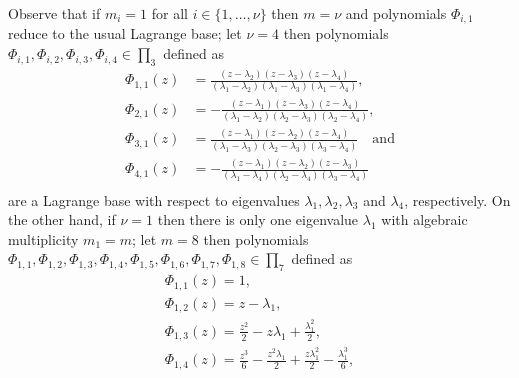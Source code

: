 \begin{remark}
Observe that if $m_{i}=1$ for all $i\in\lbrace 1, \ldots, \nu\rbrace$ then $m=\nu$
and polynomials $\Phi_{i,1}$ reduce to the usual Lagrange base;
let $\nu=4$ then polynomials
$\Phi_{i,1},\Phi_{i,2},\Phi_{i,3},\Phi_{i,4} \in\prod_{3}$ defined as 
\begin{displaymath}
\begin{split}
\Phi_{ 1, 1 }{\left (z \right )} &= \frac{\left(z - \lambda_{2}\right)
\left(z - \lambda_{3}\right) \left(z - \lambda_{4}\right)}{\left(\lambda_{1} -
\lambda_{2}\right) \left(\lambda_{1} - \lambda_{3}\right) \left(\lambda_{1} -
\lambda_{4}\right)}, \\
\Phi_{ 2, 1 }{\left (z \right )} &= - \frac{\left(z -
\lambda_{1}\right) \left(z - \lambda_{3}\right) \left(z -
\lambda_{4}\right)}{\left(\lambda_{1} - \lambda_{2}\right) \left(\lambda_{2} -
\lambda_{3}\right) \left(\lambda_{2} - \lambda_{4}\right)}, \\
\Phi_{ 3, 1 }{\left (z \right )} &= \frac{\left(z - \lambda_{1}\right) \left(z -
\lambda_{2}\right) \left(z - \lambda_{4}\right)}{\left(\lambda_{1} -
\lambda_{3}\right) \left(\lambda_{2} - \lambda_{3}\right) \left(\lambda_{3} -
\lambda_{4}\right)}\quad\text{and} \\
\Phi_{ 4, 1 }{\left (z \right )} &= - \frac{\left(z -
\lambda_{1}\right) \left(z - \lambda_{2}\right) \left(z -
\lambda_{3}\right)}{\left(\lambda_{1} - \lambda_{4}\right) \left(\lambda_{2} -
\lambda_{4}\right) \left(\lambda_{3} - \lambda_{4}\right)}\\
\end{split}
\end{displaymath}
are a Lagrange base with respect to eigenvalues $\lambda_{1},
\lambda_{2},\lambda_{3}$ and $\lambda_{4}$, respectively.  On the other hand,
if $\nu=1$ then there is only one eigenvalue $\lambda_{1}$ with algebraic
    multiplicity $m_{1}=m$; let $m=8$ then polynomials
    $\Phi_{1,1},\Phi_{1,2},\Phi_{1,3},\Phi_{1,4},\Phi_{1,5},\Phi_{1,6},\Phi_{1,7},\Phi_{1,8}\in\prod_{7}$
    defined as
\begin{equation}
\begin{array}{c}
\Phi_{ 1, 1 }{\left (z \right )} = 1, \\ 
\Phi_{ 1, 2 }{\left (z \right )} = z - \lambda_{1}, \\ 
\Phi_{ 1, 3 }{\left (z \right )} = \frac{z^{2}}{2} - z \lambda_{1} + \frac{\lambda_{1}^{2}}{2},\\ 
\Phi_{ 1, 4 }{\left (z \right )} = \frac{z^{3}}{6} - \frac{z^{2} \lambda_{1}}{2} + \frac{z \lambda_{1}^{2}}{2} - \frac{\lambda_{1}^{3}}{6}, \\ 

\end{array}
\end{equation}
\end{remark}
